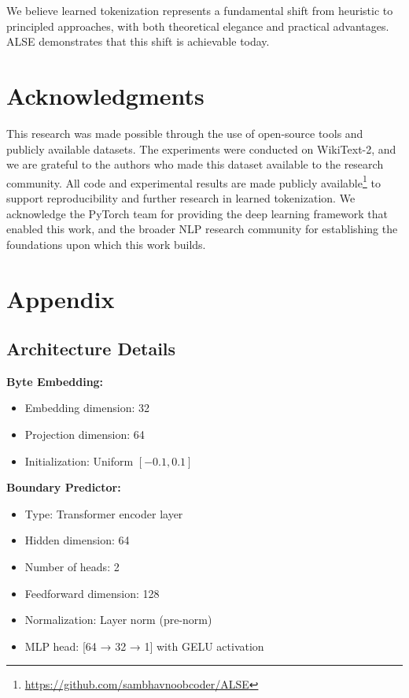 \documentclass{article}
\begin{document}
We believe learned tokenization represents a fundamental shift from heuristic to principled approaches, with both theoretical elegance and practical advantages. ALSE demonstrates that this shift is achievable today.

\section*{Acknowledgments}

This research was made possible through the use of open-source tools and publicly available datasets. The experiments were conducted on WikiText-2, and we are grateful to the authors who made this dataset available to the research community. All code and experimental results are made publicly available\footnote{\href{https://github.com/sambhavnoobcoder/ALSE}{https://github.com/sambhavnoobcoder/ALSE}} to support reproducibility and further research in learned tokenization. We acknowledge the PyTorch team for providing the deep learning framework that enabled this work, and the broader NLP research community for establishing the foundations upon which this work builds.




\clearpage
\appendix

\section{Appendix}

\subsection{Architecture Details}

\textbf{Byte Embedding:}
\begin{itemize}
    \item Embedding dimension: 32
    \item Projection dimension: 64
    \item Initialization: Uniform $[-0.1, 0.1]$
\end{itemize}

\textbf{Boundary Predictor:}
\begin{itemize}
    \item Type: Transformer encoder layer
    \item Hidden dimension: 64
    \item Number of heads: 2
    \item Feedforward dimension: 128
    \item Normalization: Layer norm (pre-norm)
    \item MLP head: [64 → 32 → 1] with GELU activation
\end{itemize}
\end{document}
